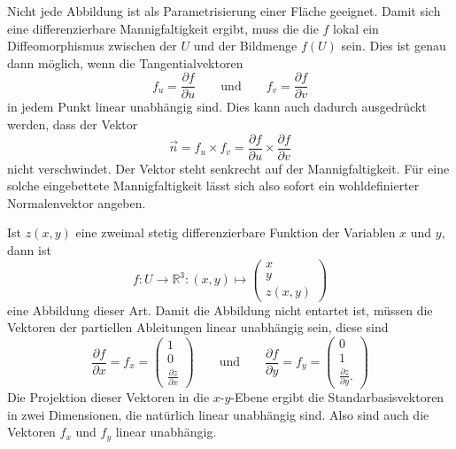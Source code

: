 Nicht jede Abbildung ist als Parametrisierung einer Fläche geeignet.
Damit sich eine differenzierbare Mannigfaltigkeit ergibt, muss die die
$f$ lokal ein Diffeomorphismus zwischen der $U$ und der Bildmenge $f(U)$
sein.
Dies ist genau dann möglich, wenn die Tangentialvektoren
\[
f_u
=
\frac{\partial f}{\partial u}
\qquad\text{und}\qquad
f_v
=
\frac{\partial f}{\partial v}
\]
in jedem Punkt linear unabhängig sind.
Dies kann auch dadurch ausgedrückt werden, dass der Vektor
\[
\vec{n}
=
f_u\times f_v
=
\frac{\partial f}{\partial u}
\times
\frac{\partial f}{\partial v}
\]
nicht verschwindet.
Der Vektor steht senkrecht auf der Mannigfaltigkeit.
Für eine solche eingebettete Mannigfaltigkeit lässt sich also sofort
ein wohldefinierter Normalenvektor angeben.

\begin{beispiel}
Ist $z(x,y)$ eine zweimal stetig differenzierbare Funktion der Variablen
$x$ und $y$, dann ist
\[
f\colon
U\to \mathbb{R}^3
:
(x,y) \mapsto \begin{pmatrix}x\\y\\z(x,y)\end{pmatrix}
\]
eine Abbildung dieser Art.
Damit die Abbildung nicht entartet ist, müssen die Vektoren der partiellen
Ableitungen linear unabhängig sein, diese sind
\begin{equation}
\frac{\partial f}{\partial x}
=
f_x
=
\begin{pmatrix}
1\\0\\ \frac{\partial z}{\partial x}
\end{pmatrix}
\qquad\text{und}\qquad
\frac{\partial f}{\partial y}
=
f_y
=
\begin{pmatrix}
0\\1\\ \frac{\partial z}{\partial y}.
\end{pmatrix}
\label{buch:kruemmung:gausskruemmung:eqn:xytangential}
\end{equation}
Die Projektion dieser Vektoren in die $x$-$y$-Ebene ergibt die 
Standarbasisvektoren in zwei Dimensionen, die natürlich linear
unabhängig sind.
Also sind auch die Vektoren $f_x$ und $f_y$ linear unabhängig.
\end{beispiel}

%
%
